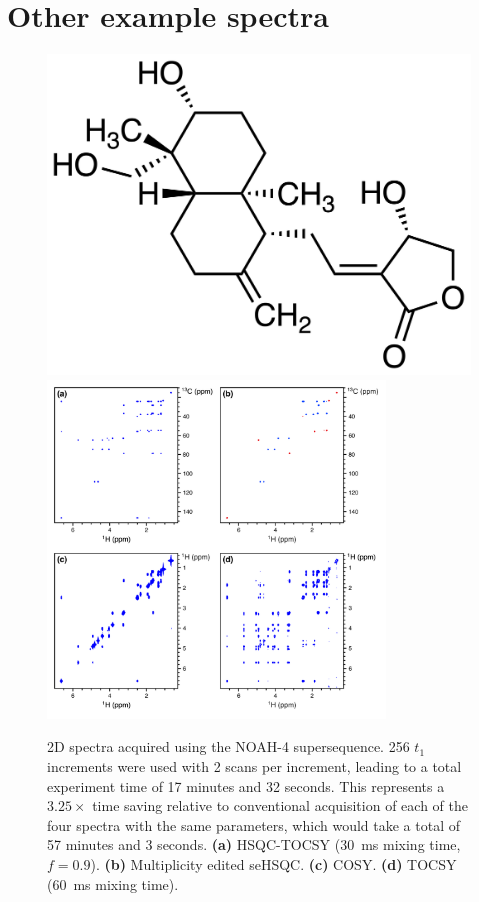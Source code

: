 \section{Other example spectra}
\label{section:si_spectra}

\begin{figure}
    \centering
    \includegraphics{./figures/andro.png}\phantom{aaaaaa}
    \includegraphics[width=0.8\textwidth]{./figures/stspct.png}
    \caption{
        2D spectra acquired using the NOAH-4  supersequence.
        256 $t_1$ increments were used with 2 scans per increment, leading to a total experiment time of 17 minutes and 32 seconds.
        This represents a $3.25\times$ time saving relative to conventional acquisition of each of the four spectra with the same parameters, which would take a total of 57 minutes and 3 seconds.
        \textbf{(a)} HSQC-TOCSY (\SI{30}{ms} mixing time, $f = 0.9$).
        \textbf{(b)} Multiplicity edited seHSQC.
        \textbf{(c)} COSY.
        \textbf{(d)} TOCSY (\SI{60}{ms} mixing time).
        \andro{}
    }
    \label{fig:stspct}
\end{figure}

